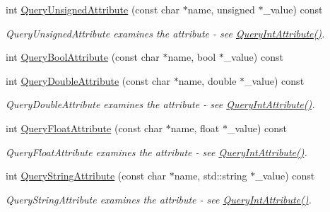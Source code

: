 \begin{DoxyCompactItemize}
\item 
\hypertarget{class_ti_xml_element_ab75c83543d4ace62f4c40d7e8e392fc3}{}\label{class_ti_xml_element_ab75c83543d4ace62f4c40d7e8e392fc3} 
int \hyperlink{class_ti_xml_element_ab75c83543d4ace62f4c40d7e8e392fc3}{Query\+Unsigned\+Attribute} (const char $\ast$name, unsigned $\ast$\+\_\+value) const
\begin{DoxyCompactList}\small\item\em Query\+Unsigned\+Attribute examines the attribute -\/ see \hyperlink{class_ti_xml_element_a5c0f739e0f6f5905a201364532e54a60}{Query\+Int\+Attribute()}. \end{DoxyCompactList}\item 
int \hyperlink{class_ti_xml_element_a5789b1488af75b6ae37a749700495ceb}{Query\+Bool\+Attribute} (const char $\ast$name, bool $\ast$\+\_\+value) const
\item 
\hypertarget{class_ti_xml_element_ae04bad29ddb281a7e6c662b3882e9928}{}\label{class_ti_xml_element_ae04bad29ddb281a7e6c662b3882e9928} 
int \hyperlink{class_ti_xml_element_ae04bad29ddb281a7e6c662b3882e9928}{Query\+Double\+Attribute} (const char $\ast$name, double $\ast$\+\_\+value) const
\begin{DoxyCompactList}\small\item\em Query\+Double\+Attribute examines the attribute -\/ see \hyperlink{class_ti_xml_element_a5c0f739e0f6f5905a201364532e54a60}{Query\+Int\+Attribute()}. \end{DoxyCompactList}\item 
\hypertarget{class_ti_xml_element_a5591929834178699b4561ab6ab460068}{}\label{class_ti_xml_element_a5591929834178699b4561ab6ab460068} 
int \hyperlink{class_ti_xml_element_a5591929834178699b4561ab6ab460068}{Query\+Float\+Attribute} (const char $\ast$name, float $\ast$\+\_\+value) const
\begin{DoxyCompactList}\small\item\em Query\+Float\+Attribute examines the attribute -\/ see \hyperlink{class_ti_xml_element_a5c0f739e0f6f5905a201364532e54a60}{Query\+Int\+Attribute()}. \end{DoxyCompactList}\item 
\hypertarget{class_ti_xml_element_afa8f8a62753a440186b5cd28e252a4e4}{}\label{class_ti_xml_element_afa8f8a62753a440186b5cd28e252a4e4} 
int \hyperlink{class_ti_xml_element_afa8f8a62753a440186b5cd28e252a4e4}{Query\+String\+Attribute} (const char $\ast$name, std\+::string $\ast$\+\_\+value) const
\begin{DoxyCompactList}\small\item\em Query\+String\+Attribute examines the attribute -\/ see \hyperlink{class_ti_xml_element_a5c0f739e0f6f5905a201364532e54a60}{Query\+Int\+Attribute()}. \end{DoxyCompactList}\item 

\end{DoxyCompactItemize}
